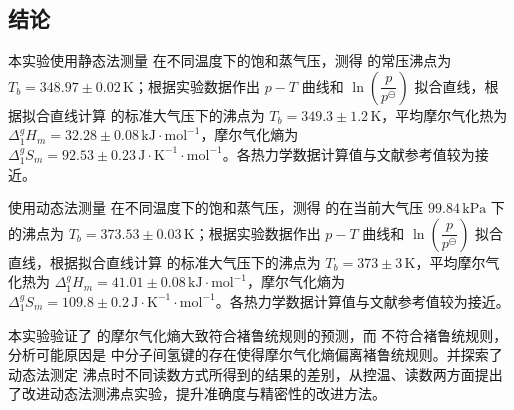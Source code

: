 \subsection{结论}

本实验使用静态法测量  在不同温度下的饱和蒸气压，测得  的常压沸点为 \( T_b = 348.97 \pm 0.02\,\mathrm{K} \)；根据实验数据作出 \( p-T \) 曲线和 \( \ln \left( \dfrac{p}{p^\ominus} \right) \) 拟合直线，根据拟合直线计算  的标准大气压下的沸点为 \( T_b = 349.3 \pm 1.2\,\mathrm{K} \)，平均摩尔气化热为 \( \Delta_1^{g} H_m = 32.28 \pm 0.08\,\mathrm{kJ\cdot mol^{-1}} \)，摩尔气化熵为 \( \Delta_1^{g} S_m = 92.53 \pm 0.23\,\mathrm{J\cdot K^{-1}\cdot mol^{-1}} \)。各热力学数据计算值与文献参考值较为接近。

使用动态法测量  在不同温度下的饱和蒸气压，测得  的在当前大气压 \( 99.84\,\mathrm{kPa} \) 下的沸点为 \( T_b = 373.53 \pm 0.03\,\mathrm{K} \)；根据实验数据作出 \( p-T \) 曲线和 \( \ln \left( \dfrac{p}{p^\ominus} \right) \) 拟合直线，根据拟合直线计算  的标准大气压下的沸点为 \( T_b = 373 \pm 3\,\mathrm{K} \)，平均摩尔气化热为 \( \Delta_1^{g} H_m = 41.01 \pm 0.08\,\mathrm{kJ\cdot mol^{-1}} \)，摩尔气化熵为 \( \Delta_1^{g} S_m = 109.8 \pm 0.2\,\mathrm{J\cdot K^{-1}\cdot mol^{-1}} \)。各热力学数据计算值与文献参考值较为接近。


本实验验证了  的摩尔气化熵大致符合褚鲁统规则的预测，而  不符合褚鲁统规则，分析可能原因是  中分子间氢键的存在使得摩尔气化熵偏离褚鲁统规则。并探索了动态法测定  沸点时不同读数方式所得到的结果的差别，从控温、读数两方面提出了改进动态法测沸点实验，提升准确度与精密性的改进方法。


